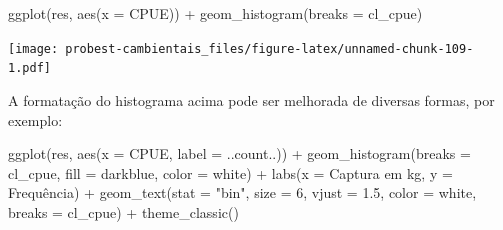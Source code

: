 \documentclass[
]{book}
\newenvironment{Shaded}{\begin{snugshade}}{\end{snugshade}}
\newcommand{\AttributeTok}[1]{\textcolor[rgb]{0.77,0.63,0.00}{#1}}
\newcommand{\DecValTok}[1]{\textcolor[rgb]{0.00,0.00,0.81}{#1}}
\newcommand{\FloatTok}[1]{\textcolor[rgb]{0.00,0.00,0.81}{#1}}
\newcommand{\FunctionTok}[1]{\textcolor[rgb]{0.00,0.00,0.00}{#1}}
\newcommand{\NormalTok}[1]{#1}
\newcommand{\SpecialCharTok}[1]{\textcolor[rgb]{0.00,0.00,0.00}{#1}}
\newcommand{\StringTok}[1]{\textcolor[rgb]{0.31,0.60,0.02}{#1}}
\begin{document}
\begin{Shaded}
\begin{Highlighting}[]
\FunctionTok{ggplot}\NormalTok{(res, }\FunctionTok{aes}\NormalTok{(}\AttributeTok{x =}\NormalTok{ CPUE)) }\SpecialCharTok{+}
  \FunctionTok{geom\_histogram}\NormalTok{(}\AttributeTok{breaks =}\NormalTok{ cl\_cpue)}
\end{Highlighting}
\end{Shaded}

\texttt{[image: probest-cambientais\_files/figure-latex/unnamed-chunk-109-1.pdf]}

A formatação do histograma acima pode ser melhorada de diversas formas, por exemplo:

\begin{Shaded}
\begin{Highlighting}[]
\FunctionTok{ggplot}\NormalTok{(res, }\FunctionTok{aes}\NormalTok{(}\AttributeTok{x =}\NormalTok{ CPUE, }\AttributeTok{label =}\NormalTok{ ..count..)) }\SpecialCharTok{+}
  \FunctionTok{geom\_histogram}\NormalTok{(}\AttributeTok{breaks =}\NormalTok{ cl\_cpue, }
                 \AttributeTok{fill =} \StringTok{\textquotesingle{}darkblue\textquotesingle{}}\NormalTok{, }\AttributeTok{color =} \StringTok{\textquotesingle{}white\textquotesingle{}}\NormalTok{) }\SpecialCharTok{+}
  \FunctionTok{labs}\NormalTok{(}\AttributeTok{x =} \StringTok{\textquotesingle{}Captura em kg\textquotesingle{}}\NormalTok{, }\AttributeTok{y =} \StringTok{\textquotesingle{}Frequência\textquotesingle{}}\NormalTok{) }\SpecialCharTok{+}
  \FunctionTok{geom\_text}\NormalTok{(}\AttributeTok{stat =} \StringTok{"bin"}\NormalTok{, }\AttributeTok{size =} \DecValTok{6}\NormalTok{, }\AttributeTok{vjust =} \FloatTok{1.5}\NormalTok{, }\AttributeTok{color =} \StringTok{\textquotesingle{}white\textquotesingle{}}\NormalTok{,}
            \AttributeTok{breaks =}\NormalTok{ cl\_cpue) }\SpecialCharTok{+}
  \FunctionTok{theme\_classic}\NormalTok{()}
\end{Highlighting}
\end{Shaded}
\end{document}
